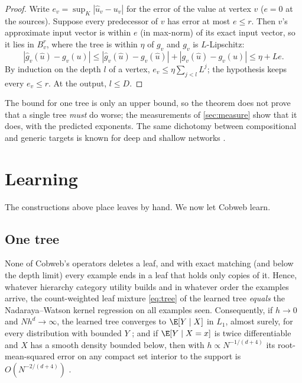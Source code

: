 \begin{proof}
Write $e_v=\sup_K|\hat u_v-u_v|$ for the error of the value at vertex $v$ ($e=0$ at the
sources).  Suppose every predecessor of $v$ has error at most $e\le r$.  Then $v$'s
approximate input vector is within $e$ (in max-norm) of its exact input vector, so it lies
in $B_v^r$, where the tree is within $\eta$ of $g_v$ and $g_v$ is $L$-Lipschitz:
\[
  |\hat g_v(\hat u)-g_v(u)|\le|\hat g_v(\hat u)-g_v(\hat u)|+|g_v(\hat u)-g_v(u)|\le\eta+Le.
\]
By induction on the depth $l$ of a vertex, $e_v\le\eta\sum_{j<l}L^j$; the hypothesis keeps
every $e_v\le r$.  At the output, $l\le D$.
\end{proof}

The bound for one tree is only an upper bound, so the theorem does not prove that a single
tree \emph{must} do worse; the measurements of \cref{sec:measure} show that it does, with
the predicted exponents.  The same dichotomy between compositional and generic targets is
known for deep and shallow networks \citep{poggio2017}.

\section{Learning}\label{sec:learn-main}

The constructions above place leaves by hand.  We now let Cobweb learn.

\subsection{One tree}

\begin{theorem}\label{thm:learn-tree}
None of Cobweb's operators deletes a leaf, and with exact matching (and below the depth
limit) every example ends in a leaf that holds only copies of it.  Hence, whatever
hierarchy category utility builds and in whatever order the examples arrive, the
count-weighted leaf mixture \eqref{eq:tree} of the learned tree \emph{equals} the
Nadaraya--Watson kernel regression on all examples seen.  Consequently, if $h\to0$ and
$Nh^d\to\infty$, the learned tree converges to $\E[Y\mid X]$ in $L_1$, almost surely, for
every distribution with bounded $Y$ \citep{devroye1989}; and if $\E[Y\mid X=x]$ is twice
differentiable and $X$ has a smooth density bounded below, then with $h\propto
N^{-1/(d+4)}$ its root-mean-squared error on any compact set interior to the support is
$O(N^{-2/(d+4)})$ \citep{wand1995}.
\end{theorem}

